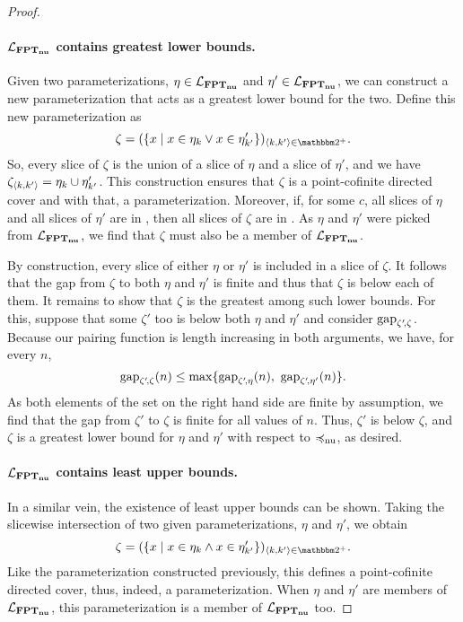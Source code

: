 \begin{proof}
  \paragraph{$\mathcal{L}_{\textnormal{\textbf{FPT$_\textbf{nu}$}}}$ contains greatest lower bounds.}
  Given two parameterizations, $\eta \in \mathcal{L}_{\textnormal{\textbf{FPT$_\textbf{nu}$}}}$ and $\eta' \in \mathcal{L}_{\textnormal{\textbf{FPT$_\textbf{nu}$}}}$, we can construct a new parameterization that acts as a greatest lower bound for the two.
  Define this new parameterization as
  \begin{equation*}
    \zeta \deq (\{x \st x \in \eta_k \lor x \in \eta'_{k'}\})_{\pair{k}{k'} \in \binary^+}.
  \end{equation*}
  So, every slice of $\zeta$ is the union of a slice of $\eta$ and a slice of $\eta'$, and we have $\zeta_{\langle k, k'\rangle} = \eta_k \cup \eta'_{k'}$.
  This construction ensures that $\zeta$ is a point-cofinite directed cover and with that, a parameterization.
  Moreover, if, for some $c$, all slices of $\eta$ and all slices of $\eta'$ are in , then all slices of $\zeta$ are in .
  As $\eta$ and $\eta'$ were picked from $\mathcal{L}_{\textnormal{\textbf{FPT$_\textbf{nu}$}}}$, we find that $\zeta$ must also be a member of $\mathcal{L}_{\textnormal{\textbf{FPT$_\textbf{nu}$}}}$.

  By construction, every slice of either $\eta$ or $\eta'$ is included in a slice of $\zeta$.
  It follows that the gap from $\zeta$ to both $\eta$ and $\eta'$ is finite and thus that $\zeta$ is below each of them.
  It remains to show that $\zeta$ is the greatest among such lower bounds.
  For this, suppose that some $\zeta'$ too is below both $\eta$ and $\eta'$ and consider $\operatorname{gap}_{\zeta'\!, \zeta}$.
  Because our pairing function is length increasing in both arguments, we have, for every $n$,
  \begin{equation*}
    \operatorname{gap}_{\zeta'\!, \zeta}(n) \le \max\{\operatorname{gap}_{\zeta'\!, \eta}(n),\ \operatorname{gap}_{\zeta'\!, \eta'}(n)\}.
  \end{equation*}
  As both elements of the set on the right hand side are finite by assumption, we find that the gap from $\zeta'$ to $\zeta$ is finite for all values of $n$.
  Thus, $\zeta'$ is below $\zeta$, and $\zeta$ is a greatest lower bound for $\eta$ and $\eta'$ with respect to $\preccurlyeq_\mathrm{nu}$, as desired.

  \paragraph{$\mathcal{L}_{\textnormal{\textbf{FPT$_\textbf{nu}$}}}$ contains least upper bounds.}
  In a similar vein, the existence of least upper bounds can be shown.
  Taking the slicewise intersection of two given parameterizations, $\eta$ and $\eta'$, we obtain
  \begin{equation*}
    \zeta \deq (\{x \st x \in \eta_k \land x \in \eta'_{k'}\})_{\pair{k}{k'} \in \binary^+}.
  \end{equation*}
  Like the parameterization constructed previously, this defines a point-cofinite directed cover, thus, indeed, a parameterization.
  When $\eta$ and $\eta'$ are members of $\mathcal{L}_{\textnormal{\textbf{FPT$_\textbf{nu}$}}}$, this parameterization is a member of $\mathcal{L}_{\textnormal{\textbf{FPT$_\textbf{nu}$}}}$ too.


\end{proof}
